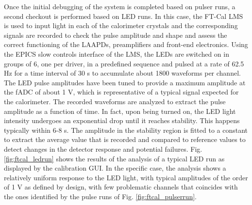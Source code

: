 Once the initial debugging of the system is completed based on pulser runs, a second checkout is performed based on LED runs. In this case, the FT-Cal LMS is used to input light in each of the calorimeter crystals and the corresponding signals are recorded to check the pulse amplitude and shape and assess the correct functioning of the LAAPDs, preamplifiers and front-end electronics. Using the EPICS slow controls interface of the LMS, the LEDs are switched on in groups of 6, one per driver, in a predefined sequence and pulsed at a rate of 62.5 Hz for a time interval of 30 s to accumulate about 1800 waveforms per channel. The LED pulse amplitudes have been tuned to provide a maximum amplitude at the fADC of about 1 V, which is representative of a typical signal expected for the calorimeter. The recorded waveforms are analyzed to extract the pulse amplitude as a function of time. In fact, upon being turned on, the LED light intensity undergoes an exponential drop until it reaches stability. This happens typically within 6-8 s. The amplitude in the stability region is fitted to a constant to extract the average value that is recorded and compared to reference values to detect changes in the detector response and potential failures. Fig. \ref{fig:ftcal_ledrun} shows the results of the analysis of a typical LED run as displayed by the calibration GUI. In the specific case, the analysis shows a relatively uniform response to the LED light, with typical amplitudes of the order of 1 V as defined by design, with few problematic channels that coincides with the ones identified by the pulse runs of Fig. \ref{fig:ftcal_pulserrun}. 


